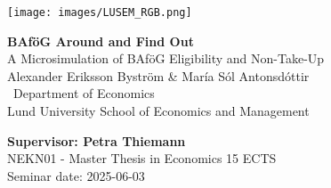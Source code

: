 
\sloppy  %

\texttt{[image: images/LUSEM\_RGB.png]} %

\vspace{2cm}
\begin{center}       
    \vspace*{2cm}
    {\LARGE \textbf{BAföG Around and Find Out} \\ 
     \large A Microsimulation of BAföG Eligibility and Non-Take-Up} \\
    \vspace{1cm}
    Alexander Eriksson Byström \& María Sól Antonsdóttir \\[0.3cm]
    \ \normalsize  Department of Economics \\ 
    Lund University School of Economics and Management
\end{center}
\vspace{2cm}

\vfill
\noindent 
\textbf{Supervisor: Petra Thiemann} \\ 
NEKN01 - Master Thesis in Economics 15 ECTS \\ 
Seminar date: 2025-06-03
\thispagestyle{empty}

\fussy  %

\newpage

\begingroup
    \tableofcontents
\endgroup

\thispagestyle{empty}



